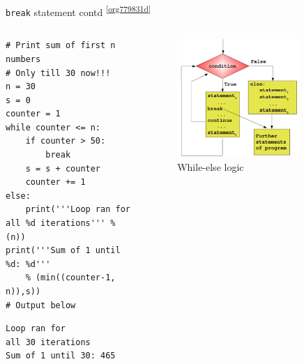 \documentclass[presentation]{beamer}
\begin{document}
\begin{frame}[label={sec:org0c71714},fragile]{\texttt{break} statement contd \textsuperscript{\ref{org779831d}}}
 \begin{columns}
\begin{column}{0.48\columnwidth}
\scriptsize
\begin{verbatim}
# Print sum of first n numbers
# Only till 30 now!!!
n = 30
s = 0
counter = 1
while counter <= n:
    if counter > 50:
        break
    s = s + counter
    counter += 1
else:
    print('''Loop ran for
all %d iterations''' % (n))
print('''Sum of 1 until %d: %d'''
    % (min((counter-1, n)),s))
# Output below
\end{verbatim}

\begin{verbatim}
Loop ran for
all 30 iterations
Sum of 1 until 30: 465
\end{verbatim}
\end{column}

\begin{column}{0.45\columnwidth}
\footnotesize
\begin{figure}[htbp]
\centering
\includegraphics[width=0.8\textwidth]{images/while_loop_with_else_break.png}
\caption{While-else logic}
\end{figure}
\end{column}
\end{columns}
\end{frame}
\end{document}
